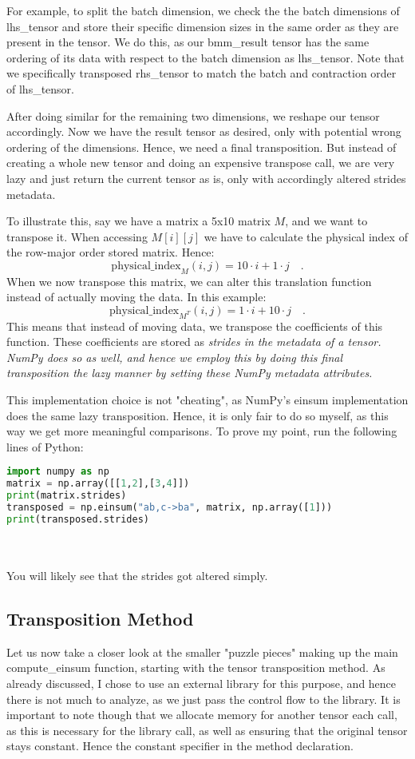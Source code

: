\documentclass[sigconf]{acmart}
\renewcommand{\texttt}[1]{\begingroup\ttfamily\sloppy\hbadness=10000 #1\endgroup}
\begin{document}
For example, to split the batch dimension, we check the the batch dimensions of \texttt{lhs\_tensor} and store their specific dimension sizes in the same order as they are present in the tensor. We do this, as our \texttt{bmm\_result} tensor has the same ordering of its data with respect to the batch dimension as \texttt{lhs\_tensor}. Note that we specifically transposed \texttt{rhs\_tensor} to match the batch and contraction order of \texttt{lhs\_tensor}.

After doing similar for the remaining two dimensions, we reshape our tensor accordingly. Now we have the result tensor as desired, only with potential wrong ordering of the dimensions. Hence, we need a final transposition. But instead of creating a whole new tensor and doing an expensive transpose call, we are very lazy and just return the current tensor as is, only with accordingly altered strides metadata.

To illustrate this, say we have a matrix a 5x10 matrix $M$, and we want to transpose it. When accessing $M[i][j]$ we have to calculate the physical index of the row-major order stored matrix. Hence:
\[ \text{physical\_index}_M(i, j) = 10 \cdot i + 1 \cdot j \quad . \]
When we now transpose this matrix, we can alter this translation function instead of actually moving the data. In this example:
\[ \text{physical\_index}_{M^T}(i, j) = 1 \cdot i + 10 \cdot j \quad . \]
This means that instead of moving data, we transpose the coefficients of this function. These coefficients are stored as \em strides \em in the metadata of a tensor. NumPy does so as well, and hence we employ this by doing this final transposition the lazy manner by setting these NumPy metadata attributes.

This implementation choice is not "cheating", as NumPy's einsum implementation does the same lazy transposition. Hence, it is only fair to do so myself, as this way we get more meaningful comparisons. To prove my point, run the following lines of Python:
\begin{lstlisting}[language=Python]
import numpy as np
matrix = np.array([[1,2],[3,4]])
print(matrix.strides)
transposed = np.einsum("ab,c->ba", matrix, np.array([1]))
print(transposed.strides)
\end{lstlisting}
\\\\
You will likely see that the strides got altered simply.


\subsection{Transposition Method}
Let us now take a closer look at the smaller "puzzle pieces" making up the main \texttt{compute\_einsum} function, starting with the tensor transposition method. As already discussed, I chose to use an external library for this purpose, and hence there is not much to analyze, as we just pass the control flow to the library. It is important to note though that we allocate memory for another tensor each call, as this is necessary for the library call, as well as ensuring that the original tensor stays constant. Hence the constant specifier in the method declaration.
\end{document}
